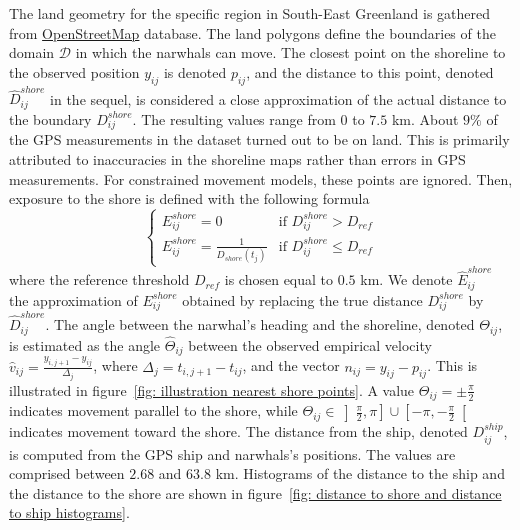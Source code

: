\documentclass[11pt]{article}
\newcommand {\1}{\mathbb{1}}
\begin{document}
The land geometry for the specific region in South-East Greenland is gathered from \href{https://www.openstreetmap.org/#map=11/70.4029/-27.2928}{OpenStreetMap} database. The land polygons define the boundaries of the domain $\mathcal{D}$ in which the narwhals can move. The closest point on the shoreline to the observed position $y_{ij}$  is denoted $p_{ij}$, and the distance to this point, denoted $\hat{D}^{shore}_{ij}$ in the sequel, is considered a close approximation of the actual distance to the boundary $D^{shore}_{ij}$. The resulting values range from $0$ to $7.5$ km. About $9\%$ of the GPS measurements in the dataset turned out to be on land. This is primarily attributed to inaccuracies in the shoreline maps rather than errors in GPS measurements. For constrained movement models, these points are ignored. Then, exposure to the shore is defined with the following formula
\begin{equation}
	\left\{
	\begin{array}{ll}
		E^{shore}_{ij}=0 & \mbox{if } D^{shore}_{ij}>D_{ref} \\
		E^{shore}_{ij}=\frac{1}{D_{shore}(t_j)} & \mbox{if } D^{shore}_{ij} \leq D_{ref}
	\end{array}
	\right.
	\label{eq: exp shore definition}
\end{equation}
where the reference threshold $D_{ref}$ is chosen equal to $0.5$ km. We denote $\hat{E}^{shore}_{ij}$ the approximation of $E^{shore}_{ij}$ obtained by replacing the true distance $D^{shore}_{ij}$ by $\hat{D}^{shore}_{ij}$.
The angle between the narwhal's heading and the shoreline, denoted $\Theta_{ij}$, is estimated as the angle $\hat{\Theta}_{ij}$ between the observed empirical velocity $\hat{v}_{ij}=\frac{y_{i,j+1}-y_{ij}}{\Delta_j}$, where $\Delta_j=t_{i,j+1}-t_{ij}$, and the vector $n_{ij}=y_{ij}-p_{ij}$. This is illustrated in figure~\ref{fig: illustration nearest shore points}. A value $\Theta_{ij}=\pm \frac{\pi}{2}$ indicates movement parallel to the shore, while $\Theta_{ij} \in \left]\frac{\pi}{2},\pi\right] \cup \left[-\pi,-\frac{\pi}{2}\right[$ indicates movement toward the shore. 
The distance from the ship, denoted $D^{ship}_{ij}$, is computed from the GPS ship and narwhals's positions. The values are comprised between $2.68$ and $63.8$ km.
Histograms of the distance to the ship and the distance to the shore are shown in figure~\ref{fig: distance to shore and distance to ship histograms}.
\end{document}
